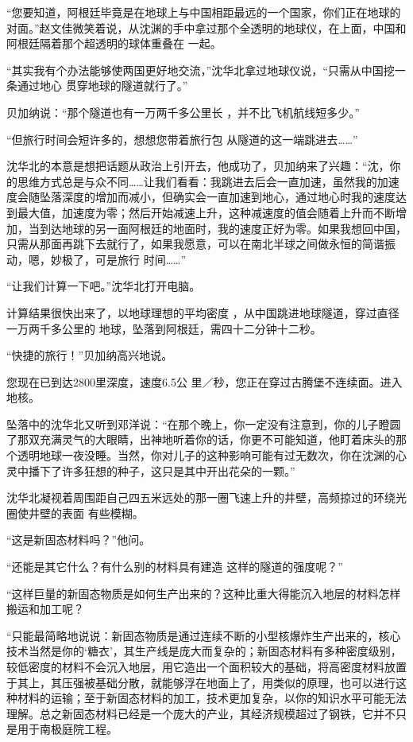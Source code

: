 \documentclass{article}
\begin{document}
“您要知道，阿根廷毕竟是在地球上与中国相距最远的一个国家，你们正在地球的对面。”赵文佳微笑着说，从沈渊的手中拿过那个全透明的地球仪，在上面，中国和阿根廷隔着那个超透明的球体重叠在
一起。 

“其实我有个办法能够使两国更好地交流，”沈华北拿过地球仪说，“只需从中国挖一条通过地心
贯穿地球的隧道就行了。” 

\newpage

贝加纳说：“那个隧道也有一万两千多公里长
，并不比飞机航线短多少。” 

“但旅行时间会短许多的，想想您带着旅行包
从隧道的这一端跳进去……” 

沈华北的本意是想把话题从政治上引开去，他成功了，贝加纳来了兴趣：“沈，你的思维方式总是与众不同……让我们看看：我跳进去后会一直加速，虽然我的加速度会随坠落深度的增加而减小，但确实会一直加速到地心，通过地心时我的速度达到最大值，加速度为零；然后开始减速上升，这种减速度的值会随着上升而不断增加，当到达地球的另一面阿根廷的地面时，我的速度正好为零。如果我想回中国，只需从那面再跳下去就行了，如果我愿意，可以在南北半球之间做永恒的简谐振动，嗯，妙极了，可是旅行
时间……” 


“让我们计算一下吧。”沈华北打开电脑。 

计算结果很快出来了，以地球理想的平均密度
\newpage
，从中国跳进地球隧道，穿过直径一万两千多公里的
地球，坠落到阿根廷，需四十二分钟十二秒。 


“快捷的旅行！”贝加纳高兴地说。 

您现在已到达2800里深度，速度6.5公
里／秒，您正在穿过古腾堡不连续面。进入地核。 

坠落中的沈华北又听到邓洋说：“在那个晚上，你一定没有注意到，你的儿子瞪圆了那双充满灵气的大眼睛，出神地听着你的话，你更不可能知道，他盯着床头的那个透明地球一夜没睡。当然，你对儿子的这种影响可能有过无数次，你在沈渊的心灵中播下了许多狂想的种子，这只是其中开出花朵的一颗。”

沈华北凝视着周围距自己四五米远处的那一圈飞速上升的井壁，高频掠过的环绕光圈使井壁的表面
有些模糊。 


“这是新固态材料吗？”他问。 

\newpage

“还能是其它什么？有什么别的材料具有建造
这样的隧道的强度呢？” 

“这样巨量的新固态物质是如何生产出来的？这种比重大得能沉入地层的材料怎样搬运和加工呢？

“只能最简略地说说：新固态物质是通过连续不断的小型核爆炸生产出来的，核心技术当然是你的‘糖衣’，其生产线是庞大而复杂的；新固态材料有多种密度级别，较低密度的材料不会沉入地层，用它造出一个面积较大的基础，将高密度材料放置于其上，其压强被基础分散，就能够浮在地面上了，用类似的原理，也可以进行这种材料的运输；至于新固态材料的加工，技术更加复杂，以你的知识水平可能无法理解。总之新固态材料已经是一个庞大的产业，其经济规模超过了钢铁，它并不只是用于南极庭院工程。
\end{document}

